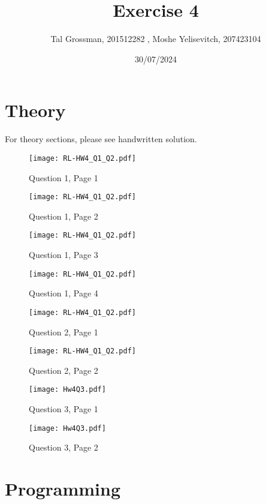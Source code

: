 \documentclass{article} %
\title{Exercise 4}
\author{Tal Grossman, 201512282 , Moshe Yelisevitch, 207423104}
\date{30/07/2024}
\begin{document}
\maketitle

\section{Theory}
\vspace{-1pt} %
For theory sections, please see handwritten solution.
\begin{figure}[H]
    \centering
    \texttt{[image: RL-HW4\_Q1\_Q2.pdf]}
    \caption{Question 1, Page 1}
\end{figure}
\begin{figure}[H]
    \centering
    \texttt{[image: RL-HW4\_Q1\_Q2.pdf]}
    \caption{Question 1, Page 2}
\end{figure}
\begin{figure}[H]
    \centering
    \texttt{[image: RL-HW4\_Q1\_Q2.pdf]}
    \caption{Question 1, Page 3}
\end{figure}
\begin{figure}[H]
    \centering
    \texttt{[image: RL-HW4\_Q1\_Q2.pdf]}
    \caption{Question 1, Page 4}
\end{figure}

\begin{figure}[H]
    \centering
    \texttt{[image: RL-HW4\_Q1\_Q2.pdf]}
    \caption{Question 2, Page 1}
\end{figure}
\begin{figure}[H]
    \centering
    \texttt{[image: RL-HW4\_Q1\_Q2.pdf]}
    \caption{Question 2, Page 2}
\end{figure}

\begin{figure}[H]
    \centering
    \texttt{[image: Hw4Q3.pdf]}
    \caption{Question 3, Page 1}
\end{figure}
\begin{figure}[H]
    \centering
    \texttt{[image: Hw4Q3.pdf]}
    \caption{Question 3, Page 2}
\end{figure}

\newpage
\section{Programming}
\end{document}
